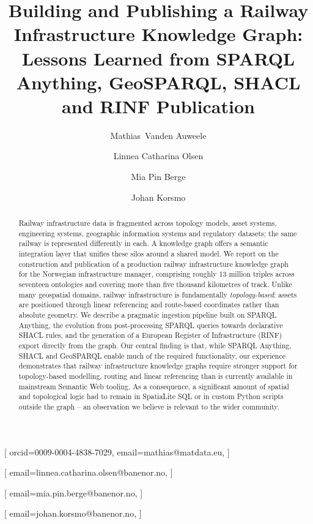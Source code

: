 \documentclass{ceurart}
\begin{document}


\title{Building and Publishing a Railway Infrastructure Knowledge Graph:
  Lessons Learned from SPARQL Anything, GeoSPARQL, SHACL and RINF Publication}

\author[1]{Mathias~{Vanden Auweele}}[
  orcid=0009-0004-4838-7029,
  email=mathias@matdata.eu,
]

\author[2]{Linnea Catharina Olsen}[
  email=linnea.catharina.olsen@banenor.no,
]

\author[2]{Mia Pin Berge}[
  email=mia.pin.berge@banenor.no,
]

\author[2]{Johan Korsmo}[
  email=johan.korsmo@banenor.no,
]

\address[1]{Matdata, Belgium}
\address[2]{Bane NOR, Norway}


\begin{abstract}
  Railway infrastructure data is fragmented across topology models, asset
  systems, engineering systems, geographic information systems and regulatory
  datasets; the same railway is represented differently in each. A knowledge
  graph offers a semantic integration layer that unifies these silos around a
  shared model. We report on the construction and publication of a
  production railway infrastructure knowledge graph for the Norwegian
  infrastructure manager, comprising roughly 13 million triples across
  seventeen ontologies and covering more than five thousand kilometres of
  track. Unlike many geospatial domains, railway infrastructure is
  fundamentally \emph{topology-based}: assets are positioned through linear
  referencing and route-based coordinates rather than absolute geometry. We
  describe a pragmatic ingestion pipeline built on SPARQL Anything, the
  evolution from post-processing SPARQL queries towards declarative SHACL
  rules, and the generation of a European Register of Infrastructure (RINF)
  export directly from the graph. Our central finding is that, while SPARQL
  Anything, SHACL and GeoSPARQL enable much of the required functionality, our
  experience demonstrates that railway infrastructure knowledge graphs require
  stronger support for topology-based modelling, routing and linear
  referencing than is currently available in mainstream Semantic Web tooling.
  As a consequence, a significant amount of spatial and topological logic had
  to remain in SpatiaLite SQL or in custom Python scripts outside the graph -- 
  an observation we believe is relevant to the wider community.
\end{abstract}
\end{document}
